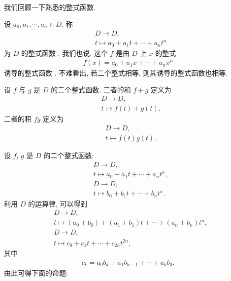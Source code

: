 \subsection*{\RootsOfPolynomials}
\markright{\RootsOfPolynomials}

我们回顾一下熟悉的整式函数.

\begin{definition}
    设 $a_0, a_1, \cdots, a_n \in D$. 称
    \begin{align*}
         & D \to D, \tag*{$f \colon$}               \\
         & t \mapsto a_0 + a_1 t + \cdots + a_n t^n
    \end{align*}
    为 $D$ 的整式函数 . 我们也说, 这个 $f$ 是由 $D$ 上 $x$ 的整式
    \begin{align*}
        f(x) = a_0 + a_1 x + \cdots + a_n x^n
    \end{align*}
    诱导的整式函数 . 不难看出, 若二个整式相等, 则其诱导的整式函数也相等.
\end{definition}

\begin{definition}
    设 $f$ 与 $g$ 是 $D$ 的二个整式函数. 二者的和 $f+g$ 定义为
    \begin{align*}
         & D \to D, \tag*{$f+g \colon$} \\
         & t \mapsto f(t) + g(t).
    \end{align*}
    二者的积 $fg$ 定义为
    \begin{align*}
         & D \to D, \tag*{$fg \colon$} \\
         & t \mapsto f(t) g(t).
    \end{align*}
\end{definition}

设 $f$, $g$ 是 $D$ 的二个整式函数:
\begin{align*}
     & D \to D, \tag*{$f \colon$}                \\
     & t \mapsto a_0 + a_1 t + \cdots + a_n t^n, \\
     & D \to D, \tag*{$g \colon$}                \\
     & t \mapsto b_0 + b_1 t + \cdots + b_n t^n.
\end{align*}
利用 $D$ 的运算律, 可以得到
\begin{align*}
     & D \to D, \tag*{$f+g \colon$}                                      \\
     & t \mapsto (a_0 + b_0) + (a_1 + b_1) t + \cdots + (a_n + b_n) t^n, \\
     & D \to D, \tag*{$fg \colon$}                                       \\
     & t \mapsto c_0 + c_1 t + \cdots + c_{2n} t^{2n},
\end{align*}
其中
\begin{align*}
    c_k = a_0 b_k + a_1 b_{k-1} + \cdots + a_k b_0.
\end{align*}
由此可得下面的命题:

